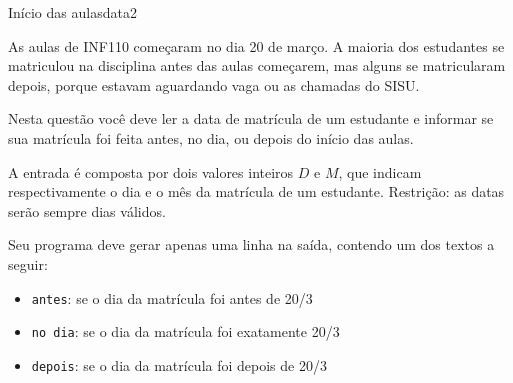 \documentclass[12pt,a4paper,oneside]{article}
\begin{document}
\begin{problem}{Início das aulas}{data}{2}

As aulas de INF110 começaram no dia 20 de março. A maioria dos estudantes se matriculou na disciplina antes das aulas começarem, mas alguns se matricularam depois, porque estavam aguardando vaga ou as chamadas do SISU.

Nesta questão você deve ler a data de matrícula de um estudante e informar se sua matrícula foi feita antes, no dia, ou depois do início das aulas.

%

\InputFile

A entrada é composta por dois valores inteiros $D$ e $M$, que indicam respectivamente o dia e o mês da matrícula de um estudante. Restrição: as datas serão sempre dias válidos.



\OutputFile

Seu programa deve gerar apenas uma linha na saída, contendo um dos textos a seguir:
\begin{itemize}
    \item \texttt{antes}: se o dia da matrícula foi antes de 20/3
    \item \texttt{no dia}: se o dia da matrícula foi exatamente 20/3
    \item \texttt{depois}: se o dia da matrícula foi depois de 20/3
\end{itemize}

\Example

\begin{example}
%
\end{example}

\begin{example}
%
\end{example}

\begin{example}
%
\end{example}

\begin{example}
%
\end{example}


\end{problem}
\end{document}
